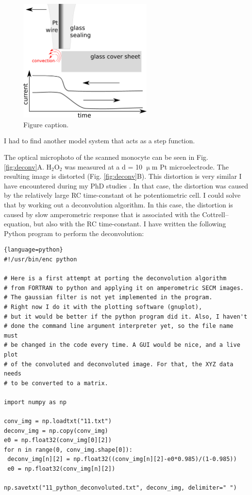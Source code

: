 \documentclass[a4paper, 11pt, oneside, bibliography=totoc]{article}
\begin{document}
\begin{figure}
\centering
 \includegraphics[width=0.6\textwidth]{step_conv.eps}
\caption{Figure caption.}
\label{fig:convective}
\end{figure}

I had to find another model system that acts as a step function. 





The optical microphoto of the scanned monocyte can be seen in Fig. \ref{fig:deconv}A. H$_2$O$_2$ was measured at a d = 10 $\upmu$m Pt microelectrode. The resulting image is distorted (Fig. \ref{fig:deconv}B). This distortion is very similar I have encountered during my PhD studies \cite{kiss2015deconvolution, kiss2015deconvolution2}. In that case, the distortion was caused by the relatively large RC time-constant ot he potentiometric cell. I could solve that by working out a deconvolution algorithm. In this case, the distortion is caused by slow amperometric response that is associated with the Cottrell--equation, but also with the RC time-constant. I have written the following Python program to perform the deconvolution:

\begin{lstlisting}{language=python}
#!/usr/bin/enc python

# Here is a first attempt at porting the deconvolution algorithm
# from FORTRAN to python and applying it on amperometric SECM images.
# The gaussian filter is not yet implemented in the program.
# Right now I do it with the plotting software (gnuplot),
# but it would be better if the python program did it. Also, I haven't
# done the command line argument interpreter yet, so the file name must
# be changed in the code every time. A GUI would be nice, and a live plot
# of the convoluted and deconvoluted image. For that, the XYZ data needs
# to be converted to a matrix.

import numpy as np

conv_img = np.loadtxt("11.txt")
deconv_img = np.copy(conv_img)
e0 = np.float32(conv_img[0][2])
for n in range(0, conv_img.shape[0]):
 deconv_img[n][2] = np.float32((conv_img[n][2]-e0*0.985)/(1-0.985))
 e0 = np.float32(conv_img[n][2])

np.savetxt("11_python_deconvoluted.txt", deconv_img, delimiter=" ")
\end{lstlisting}
\end{document}
